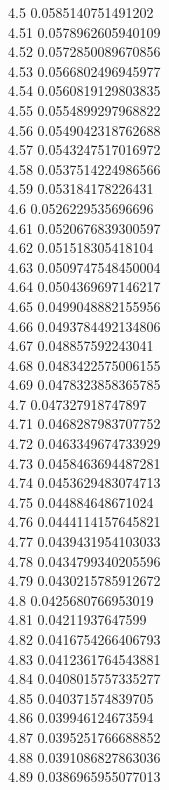 {4.5	0.0585140751491202\\
4.51	0.0578962605940109\\
4.52	0.0572850089670856\\
4.53	0.0566802496945977\\
4.54	0.0560819129803835\\
4.55	0.0554899297968822\\
4.56	0.0549042318762688\\
4.57	0.0543247517016972\\
4.58	0.0537514224986566\\
4.59	0.053184178226431\\
4.6	0.0526229535696696\\
4.61	0.0520676839300597\\
4.62	0.051518305418104\\
4.63	0.0509747548450004\\
4.64	0.0504369697146217\\
4.65	0.0499048882155956\\
4.66	0.0493784492134806\\
4.67	0.048857592243041\\
4.68	0.0483422575006155\\
4.69	0.0478323858365785\\
4.7	0.047327918747897\\
4.71	0.0468287983707752\\
4.72	0.0463349674733929\\
4.73	0.0458463694487281\\
4.74	0.0453629483074713\\
4.75	0.044884648671024\\
4.76	0.0444114157645821\\
4.77	0.0439431954103033\\
4.78	0.0434799340205596\\
4.79	0.0430215785912672\\
4.8	0.0425680766953019\\
4.81	0.04211937647599\\
4.82	0.0416754266406793\\
4.83	0.0412361764543881\\
4.84	0.0408015757335277\\
4.85	0.040371574839705\\
4.86	0.039946124673594\\
4.87	0.0395251766688852\\
4.88	0.0391086827863036\\
4.89	0.0386965955077013\\
}
